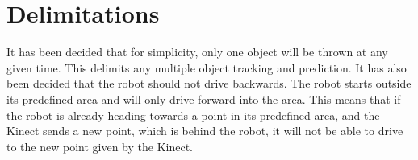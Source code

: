 \section{Delimitations}
\label{sec:Delimitations}
It has been decided that for simplicity, only one object will be thrown at any given time. This delimits any multiple object tracking and prediction. \newline
It has also been decided that the robot should not drive backwards. The robot starts outside its predefined area and will only drive forward into the area. This means that if the robot is already heading towards a point in its predefined area, and the Kinect sends a new point, which is behind the robot, it will not be able to drive to the new point given by the Kinect. 
